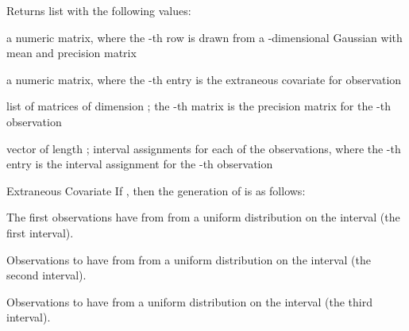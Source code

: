 \documentclass[a4paper]{book}
\begin{document}
\begin{Value}
Returns list with the following values:

\begin{ldescription}
\item[\code{X}] a   numeric matrix, where
the -th row is drawn from a -dimensional Gaussian with mean
 and precision matrix 

\item[\code{Z}] a   numeric matrix, where
the -th entry is the extraneous covariate  for
observation 

\item[\code{true\_precision}] list of  matrices of dimension
; the -th matrix is the precision matrix for
the -th observation

\item[\code{interval}] vector of length ; interval assignments
for each of the observations, where the -th entry is the interval
assignment for the -th observation
\end{ldescription}
\end{Value}
%
\begin{Section}{Extraneous Covariate}
If , then the generation of  is as follows:

The first  observations have  from from a uniform
distribution on the interval  (the first interval).

Observations  to  have  from from a uniform
distribution on the interval  (the second interval).

Observations  to  have  from a
uniform distribution on the interval  (the third interval).
\end{Section}
%
\end{document}
